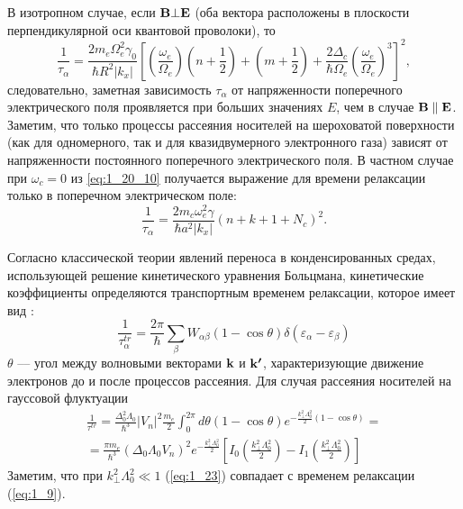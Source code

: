 В изотропном случае, если $\boldsymbol{\mathbf{B}}\bot\boldsymbol{\mathbf{E}}$ (оба вектора расположены в плоскости перпендикулярной оси квантовой проволоки), то
\begin{equation}
\label{eq:1_20_10}
\frac{1}{\tau_\alpha}=\frac{2m_e\Omega^2_e \gamma_0}{\hbar R^2 \left|k_x\right|} \left[\left(\frac{\omega_e}{\Omega_e}\right) \left(n+\frac{1}{2}\right)+ \left(m+\frac{1}{2}\right)+ \frac{2\Delta_c}{\hbar\Omega_e} \left(\frac{\omega_e}{\Omega_e}\right)^3\right]^2,
\end{equation}
следовательно, заметная зависимость $\tau_\alpha$ от напряженности поперечного электрического поля проявляется при больших значениях $E$, чем в случае $\boldsymbol{\mathbf{B}}\parallel \boldsymbol{\mathbf{E}}$. Заметим, что только процессы рассеяния носителей на шероховатой поверхности (как для одномерного, так и для квазидвумерного электронного газа) зависят от напряженности постоянного поперечного электрического поля.
В частном случае при $\omega_c = 0$ из \eqref{eq:1_20_10} получается выражение для времени релаксации только в поперечном электрическом поле: 
\begin{equation} \label{eq:42_50}
\frac{1}{\tau _{\alpha } } =\frac{2m_c \omega_e^2 \gamma }{\hbar a^2 \left|k_x \right|} \left(n+k+1+N_c \right)^2.
\end{equation}

Согласно классической теории явлений переноса в конденсированных средах, использующей решение кинетического уравнения Больцмана, кинетические коэффициенты определяются транспортным временем релаксации, которое имеет вид \cite{Bonch1977}:
\begin{equation}\label{eq:1_22}
\frac{1}{\tau^{tr}_\alpha}=\frac{2\pi}{\hbar }\sum_\beta{W_{\alpha\beta}(1-\cos\theta) \delta\left(\varepsilon_\alpha-\varepsilon_\beta\right)}
\end{equation}
$\theta$ --– угол между волновыми векторами $\boldsymbol{\mathbf{k}}$ и $\boldsymbol{\mathbf{k'}}$, характеризующие движение электронов до и после процессов рассеяния. Для случая рассеяния носителей на гауссовой флуктуации
\begin{multline}\label{eq:1_23}
\frac{1}{\tau^{tr}}= \frac{\Delta^2_0\Lambda_0}{\hbar^3} \left|V_n\right|^2\frac{m_e}{2} \int^{2\pi}_0{d\theta(1-\cos\theta) e^{-\frac{k^2_\bot\Lambda^2_0}{2}(1-\cos\theta)}} = \\
= \frac{\pi m_e}{\hbar^3}\left(\Delta_0\Lambda_0 V_n\right)^2 e^{-\frac{k^2_\bot\Lambda^2_0}{2}} \left[I_0\left(\frac{k^2_\bot\Lambda^2_0}{2}\right)-I_1\left(\frac{k^2_\bot\Lambda^2_0}{2}\right)\right]
\end{multline}
Заметим, что при $k^2_\bot\Lambda^2_0 \ll 1$ (\ref{eq:1_23}) совпадает с временем релаксации (\ref{eq:1_9}).

